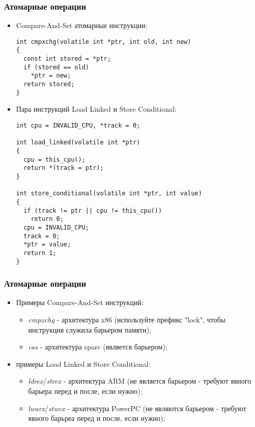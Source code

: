 \begin{frame}[fragile]
\frametitle{Атомарные операции}

\begin{itemize}
  \item Compare-And-Set атомарные инструкции:
    \begin{lstlisting}
int cmpxchg(volatile int *ptr, int old, int new)
{
  const int stored = *ptr;
  if (stored == old)
    *ptr = new;
  return stored;
}
    \end{lstlisting}
  \item Пара инструкций Load Linked и Store Conditional:
    \begin{lstlisting}
int cpu = INVALID_CPU, *track = 0;

int load_linked(volatile int *ptr)
{
  cpu = this_cpu();
  return *(track = ptr);
}

int store_conditional(volatile int *ptr, int value)
{
  if (track != ptr || cpu != this_cpu())
    return 0;
  cpu = INVALID_CPU;
  track = 0;
  *ptr = value;
  return 1;
}
    \end{lstlisting}
\end{itemize}
\end{frame}

\begin{frame}
\frametitle{Атомарные операции}

\begin{itemize}
  \item Примеры Compare-And-Set инструкций:
        \begin{itemize}
          \item \emph{cmpxchg} - архитектура x86 (используйте префикс "lock",
                чтобы инструкция служила барьером памяти);
          \item \emph{cas} - архитектура sparc (является барьером);
        \end{itemize}
  \item примеры Load Linked и Store Conditional:
        \begin{itemize}
          \item \emph{ldrex}/\emph{strex} - архитектура ARM (не является
                барьером - требуют явного барьера перед и после, если нужно);
          \item \emph{lwarx}/\emph{stwcx} - архитектура PowerPC (не являются
                барьером - требуют явного барьреа перед и после, если нужно);
        \end{itemize}
\end{itemize}
\end{frame}

